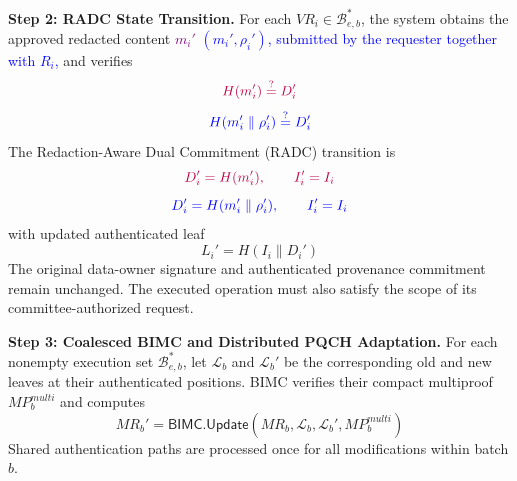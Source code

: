 \documentclass[lettersize,journal]{IEEEtran}
\begin{document}
\medskip
\noindent\textbf{Step 2: RADC State Transition.}
For each $VR_i\in\mathcal{B}_{e,b}^{*}$,
the system obtains the approved redacted
content \textcolor{purple}{$m_i'$}\textcolor{blue}{ $(m_i',\rho_i')$, submitted by the requester together with $R_i$,} and verifies
\begin{equation}
{\color{purple}H(m_i')\stackrel{?}{=}D_i'}
\end{equation}
\begin{equation}
{\color{blue}H(m_i'\parallel\rho_i')\stackrel{?}{=}D_i'}
\end{equation}
The Redaction-Aware Dual Commitment (RADC)
transition is
\begin{equation}
{\color{purple}D_i'=H(m_i'),\qquad I_i'=I_i}
\end{equation}
\begin{equation}
{\color{blue}D_i'=H(m_i'\parallel\rho_i'),\qquad I_i'=I_i}
\end{equation}
with updated authenticated leaf
\begin{equation}
L_i'=H(I_i\parallel D_i')
\end{equation}
The original data-owner signature and
authenticated provenance commitment remain
unchanged. The executed operation must also
satisfy the scope of its committee-authorized
request.

\medskip
\noindent\textbf{Step 3: Coalesced BIMC and
Distributed PQCH Adaptation.}
For each nonempty execution set
$\mathcal{B}_{e,b}^{*}$, let
$\mathcal{L}_b$ and $\mathcal{L}_b'$ be the
corresponding old and new leaves at their
authenticated positions. BIMC verifies their
compact multiproof $MP_b^{multi}$ and computes
\begin{equation}
MR_b'=
\mathsf{BIMC.Update}
(MR_b,\mathcal{L}_b,\mathcal{L}_b',
MP_b^{multi})
\end{equation}
Shared authentication paths are processed
once for all modifications within batch $b$.
\end{document}
